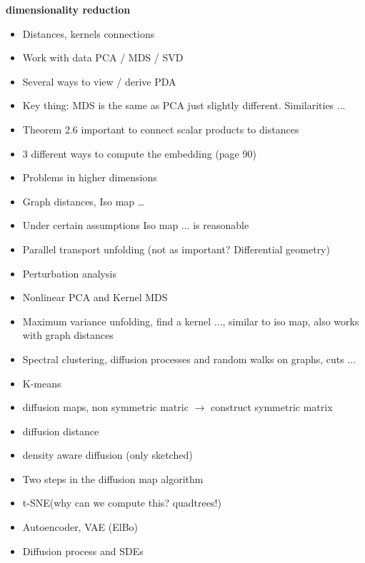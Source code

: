 \textbf{dimensionality reduction}

\begin{itemize}
    \item Distances, kernels connections
    \item Work with data PCA / MDS / SVD
    \item Several ways to view / derive PDA 
    \item Key thing: MDS is the same as PCA just slightly different. Similarities ... 
    \item Theorem 2.6 important to connect scalar products to distances 
    \item 3 different ways to compute the embedding (page 90)
    \item Problems in higher dimensions
    \item Graph distances, Iso map \dots 
    \item Under certain assumptions Iso map ... is reasonable 
    \item Parallel transport unfolding (not as important? Differential geometry)
    \item Perturbation analysis 
    \item Nonlinear PCA and Kernel MDS 
    \item Maximum variance unfolding, find a kernel ..., similar to iso map, also works with graph distances
    \item Spectral clustering, diffusion processes and random walks on graphs, cuts ...
    \item K-means 
    \item diffusion maps, non symmetric matric $\to$ construct symmetric matrix
    \item diffusion distance 
    \item density aware diffusion (only sketched)
    \item Two steps in the diffusion map algorithm 
    \item t-SNE(why can we compute this? quadtrees!)
    \item Autoencoder, VAE (ElBo)
    \item Diffusion process and SDEs 
\end{itemize}



